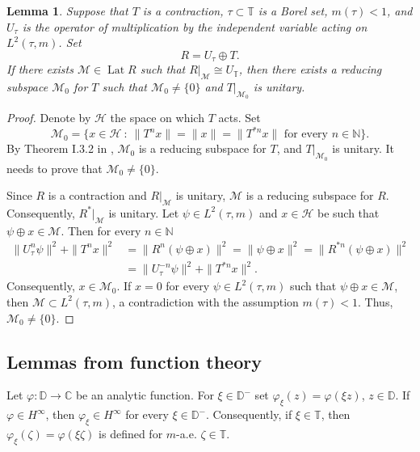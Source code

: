 \documentclass[a4paper,oneside,11pt]{amsart}
\numberwithin{equation}{section}
\theoremstyle{plain}
\newtheorem{lemma}[theorem]{Lemma}
\theoremstyle{definition}
\begin{document}
\begin{lemma}\label{lemtau}  Suppose that $T$ is a contraction,  $\tau\subset\mathbb T$ is a Borel set,  $m(\tau)<1$, 
and $U_\tau$ is the operator of multiplication by the independent variable acting on $L^2(\tau,m)$.   
Set 
\begin{equation*}  R=U_{\tau}\oplus T.
\end{equation*}
If there exists  $\mathcal M\in\operatorname{Lat}R$ such that  $R|_{\mathcal M}\cong U_{\mathbb T}$, then 
there exists a reducing subspace $\mathcal M_0$ for $T$ such that $\mathcal M_0\neq\{0\}$ and
   $T|_{\mathcal M_0}$ is unitary. 
\end{lemma}
\begin{proof} Denote by $\mathcal H$ the space on which $T$ acts.
Set \begin{equation*} \mathcal M_0=\{x\in\mathcal H\ \colon \ \|T^nx\|=\|x\|=\|T^{*n}x\| 
\text{ for every } n\in\mathbb N\}.
 \end{equation*}
 By Theorem I.3.2 in \cite{sznfbk}, $\mathcal M_0$ is a reducing subspace for $T$, and 
$T|_{\mathcal M_0}$ is unitary. It needs to prove that $\mathcal M_0\neq\{0\}$.  

Since $R$ is a contraction and  $R|_{\mathcal M}$ is unitary, 
 $\mathcal M$ is a reducing subspace for $R$. Consequently,  $R^*|_{\mathcal M}$ is unitary. 
Let $\psi\in L^2(\tau,m)$ and $x\in\mathcal H$ be such that $\psi\oplus x\in\mathcal M$.
Then for every $n\in\mathbb N$ 
\begin{align*} 
\|U_{\tau}^n\psi\|^2+\|T^nx\|^2&=\|R^n(\psi\oplus x)\|^2=\|\psi\oplus x\|^2=\|R^{*n}(\psi\oplus x)\|^2
\\&=
\|U_{\tau}^{-n}\psi\|^2+\|T^{*n}x\|^2.
\end{align*} 
Consequently, $x\in\mathcal M_0$. If $x=0$ for every $\psi\in L^2(\tau,m)$ 
such that $\psi\oplus x\in\mathcal M$, then $\mathcal M\subset  L^2(\tau,m)$, 
a contradiction with the assumption $m(\tau)<1$. Thus,  $\mathcal M_0\neq\{0\}$. 
\end{proof}




\subsection{Lemmas from function theory}



Let $\varphi\colon\mathbb D\to\mathbb C$ be an analytic function. For $\xi\in\mathbb D^-$ set 
$\varphi_\xi(z)=\varphi(\xi z)$, $z\in\mathbb D$. If $\varphi\in H^\infty$, then  $\varphi_\xi\in H^\infty$ for every 
 $\xi\in\mathbb D^-$. Consequently, if $\xi\in\mathbb T$, then  
$\varphi_\xi(\zeta)=\varphi(\xi\zeta)$ is defined for $m$-a.e. $\zeta\in\mathbb T$. 
\end{document}
